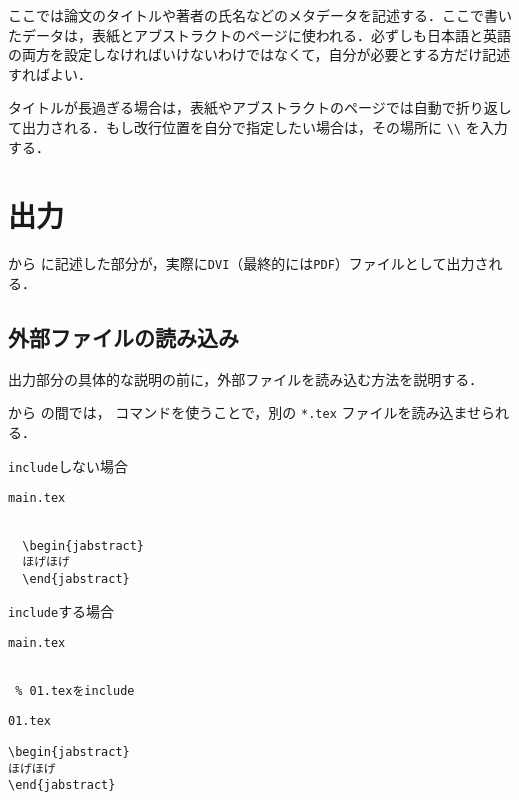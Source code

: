 ここでは論文のタイトルや著者の氏名などのメタデータを記述する．ここで書いたデータは，表紙とアブストラクトのページに使われる．必ずしも日本語と英語の両方を設定しなければいけないわけではなくて，自分が必要とする方だけ記述すればよい．

タイトルが長過ぎる場合は，表紙やアブストラクトのページでは自動で折り返して出力される．もし改行位置を自分で指定したい場合は，その場所に \verb|\\| を入力する．


\section{出力}

\verb|| から \verb|| に記述した部分が，実際に\texttt{DVI}（最終的には\texttt{PDF}）ファイルとして出力される．

\subsection{外部ファイルの読み込み}

出力部分の具体的な説明の前に，外部ファイルを読み込む方法を説明する．

\verb|| から \verb|| の間では，\verb|| コマンドを使うことで，別の \texttt{*.tex} ファイルを読み込ませられる． 

\begin{itembox}[l]{\texttt{include}しない場合}
  \begin{itembox}[l]{\texttt{main.tex}}
\begin{verbatim}

  \begin{jabstract}
  ほげほげ
  \end{jabstract}

\end{verbatim}
  \end{itembox}
\end{itembox}

\begin{itembox}[l]{\texttt{include}する場合}

\begin{minipage}{0.5\hsize}
\begin{itembox}[l]{\texttt{main.tex}}
\begin{verbatim}

 % 01.texをinclude

\end{verbatim}
\end{itembox}
\end{minipage}

\begin{minipage}{0.5\hsize}
\begin{itembox}[l]{\texttt{01.tex}}
\begin{verbatim}
\begin{jabstract}
ほげほげ
\end{jabstract}
\end{verbatim}
\end{itembox}
\end{minipage}

\end{itembox}

